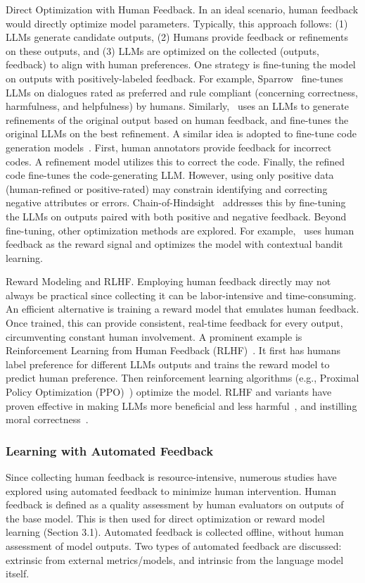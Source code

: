 \documentclass[12pt]{extarticle}
\begin{document}
Direct Optimization with Human Feedback. In an ideal scenario, human feedback would directly optimize model parameters. Typically, this approach follows: (1) LLMs generate candidate outputs, (2) Humans provide feedback or refinements on these outputs, and (3) LLMs are optimized on the collected (outputs, feedback) to align with human preferences. One strategy is fine-tuning the model on outputs with positively-labeled feedback. For example, Sparrow~\cite{glaese2022improving} fine-tunes LLMs on dialogues rated as preferred and rule compliant (concerning correctness, harmfulness, and helpfulness) by humans. Similarly,~\cite{scheurer2023training} uses an LLMs to generate refinements of the original output based on human feedback, and fine-tunes the original LLMs on the best refinement. A similar idea is adopted to fine-tune code generation models~\cite{chen2023improving}. First, human annotators provide feedback for incorrect codes. A refinement model utilizes this to correct the code. Finally, the refined code fine-tunes the code-generating LLM. However, using only positive data (human-refined or positive-rated) may constrain identifying and correcting negative attributes or errors. Chain-of-Hindsight~\cite{liu2023chain} addresses this by fine-tuning the LLMs on outputs paired with both positive and negative feedback. Beyond fine-tuning, other optimization methods are explored. For example,~\cite{gao2023continually} uses human feedback as the reward signal and optimizes the model with contextual bandit learning.

Reward Modeling and RLHF. Employing human feedback directly may not always be practical since collecting it can be labor-intensive and time-consuming. An efficient alternative is training a reward model that emulates human feedback. Once trained, this can provide consistent, real-time feedback for every output, circumventing constant human involvement. A prominent example is Reinforcement Learning from Human Feedback (RLHF)~\cite{ouyang2022training}. It first has humans label preference for different LLMs outputs and trains the reward model to predict human preference. Then reinforcement learning algorithms (e.g., Proximal Policy Optimization (PPO)~\cite{schulman2017proximal}) optimize the model. RLHF and variants have proven effective in making LLMs more beneficial and less harmful~\cite{bai2022training}, and instilling moral correctness~\cite{ganguli2023capacity}.

\subsubsection{Learning with Automated Feedback}
Since collecting human feedback is resource-intensive, numerous studies have explored using automated feedback to minimize human intervention. Human feedback is defined as a quality assessment by human evaluators on outputs of the base model. This is then used for direct optimization or reward model learning (Section 3.1). Automated feedback is collected offline, without human assessment of model outputs. Two types of automated feedback are discussed: extrinsic from external metrics/models, and intrinsic from the language model itself.
\end{document}

